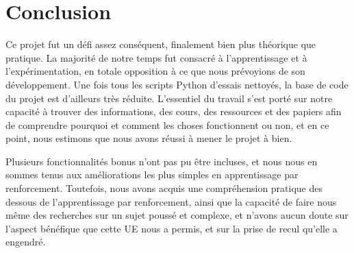 \chapter*{Conclusion}
Ce projet fut un défi assez conséquent, finalement bien plus théorique que pratique. La majorité de notre temps fut consacré à l'apprentissage et à l'expérimentation, en totale opposition à ce que nous prévoyions de son développement. Une fois tous les scripts Python d'essais nettoyés, la base de code du projet est d'ailleurs très réduite. L'essentiel du travail s'est porté sur notre capacité à trouver des informations, des cours, des ressources et des papiers afin de comprendre pourquoi et comment les choses fonctionnent ou non, et en ce point, nous estimons que nous avons réussi à mener le projet à bien.
\par
Plusieurs fonctionnalités bonus n'ont pas pu être incluses, et nous nous en sommes tenus aux améliorations les plus simples en apprentissage par renforcement. Toutefois, nous avons acquis une compréhension pratique des dessous de l'apprentissage par renforcement, ainsi que la capacité de faire nous même des recherches sur un sujet poussé et complexe, et n'avons aucun doute sur l'aspect bénéfique que cette UE nous a permis, et sur la prise de recul qu'elle a engendré.